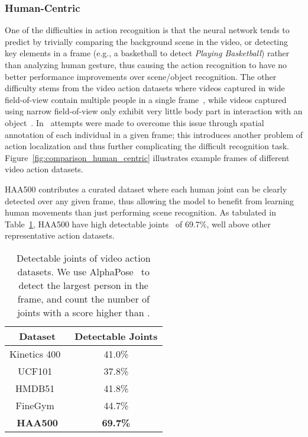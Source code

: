\documentclass[10pt,twocolumn,letterpaper]{article}
\begin{document}
\subsubsection{Human-Centric}


One of the difficulties in action recognition is that the neural network tends to predict by trivially comparing the background scene in the video, or detecting key elements in a frame (e.g., a basketball to detect \textit{Playing Basketball}) rather than analyzing human gesture, thus causing the action recognition to have no better performance improvements over scene/object recognition. The other difficulty stems from the video action datasets where videos captured in wide field-of-view contain multiple people in a single frame~\cite{AVA,kinetics400,zhao2019hacs}, while videos captured using narrow field-of-view only exhibit very little body part in interaction with an object~\cite{goyal2017something,momentsintime}. 
In~\cite{AVA} attempts were made to overcome this issue through spatial annotation of each individual in a given frame; this introduces another problem of action localization and thus further complicating the difficult recognition task. Figure~\ref{fig:comparison_human_centric} illustrates example frames of different video action datasets. 

HAA500 contributes a curated dataset where each human joint can be clearly detected over any given frame, thus allowing the model to benefit from learning human movements than just performing scene recognition. As tabulated in Table~\ref{table:comparison_joint}, HAA500 have high detectable joints~\cite{alphapose} of 69.7\%, well above other representative action datasets.


\begin{table}
\begin{center}
\begin{tabular}{|c|c|}
\hline 
Dataset                         & Detectable Joints            \\ \hline
Kinetics 400~\cite{kinetics400} &         41.0\%               \\ \hline
UCF101~\cite{ucf101}            &         37.8\%               \\ \hline
HMDB51~\cite{HMDB51}            &         41.8\%               \\ \hline
FineGym~\cite{finegym}          &         44.7\%               \\ \hline
\textbf{HAA500}                 & \textbf{69.7\%}              \\ \hline
\end{tabular}
\end{center}
\caption{Detectable joints of video action datasets. We use AlphaPose~\cite{alphapose} to detect the largest person in the frame, and count the number of joints with a score higher than . }
\label{table:comparison_joint}
\end{table}
\end{document}
